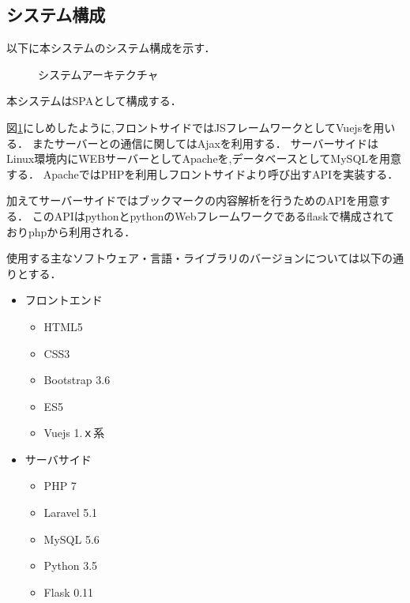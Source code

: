 \documentclass[a4paper,10pt,fleqn]{jsarticle}
\begin{document}
\subsection{システム構成}
以下に本システムのシステム構成を示す．
\begin{figure}[htbp]
  \begin{center}
    \caption{システムアーキテクチャ}
    \label{fig:system}
  \end{center}
\end{figure}
本システムはSPAとして構成する．\par
図\ref{fig:system}にしめしたように,フロントサイドではJSフレームワークとしてVuejsを用いる． またサーバーとの通信に関してはAjaxを利用する．
サーバーサイドはLinux環境内にWEBサーバーとしてApacheを,データベースとしてMySQLを用意する． ApacheではPHPを利用しフロントサイドより呼び出すAPIを実装する．\par
加えてサーバーサイドではブックマークの内容解析を行うためのAPIを用意する． このAPIはpythonとpythonのWebフレームワークであるflaskで構成されておりphpから利用される．\\
\par
使用する主なソフトウェア・言語・ライブラリのバージョンについては以下の通りとする．
\begin{itemize}
 \item フロントエンド
    \begin{itemize}
    \item HTML5
    \item CSS3
      \item Bootstrap 3.6
      \item ES5
      \item Vuejs 1.ｘ系
     \end{itemize}
 \item サーバサイド
     \begin{itemize}
    \item PHP 7
    \item Laravel  5.1
      \item MySQL 5.6
      \item Python 3.5
      \item Flask 0.11
     \end{itemize}
\end{itemize}
\end{document}
